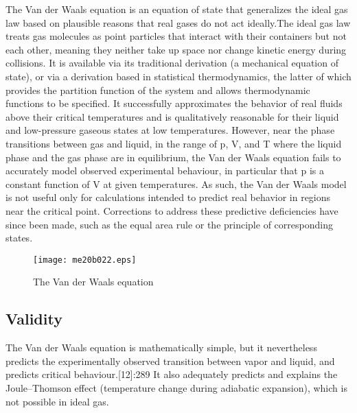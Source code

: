 The Van der Waals equation is an equation of state that generalizes the ideal gas law based on plausible reasons that real gases do not act ideally.The ideal gas law treats gas molecules as point particles that interact with their containers but not each other, meaning they neither take up space nor change kinetic energy during collisions.
It is available via its traditional derivation (a mechanical equation of state), or via a derivation based in statistical thermodynamics, the latter of which provides the partition function of the system and allows thermodynamic functions to be specified. It successfully approximates the behavior of real fluids above their critical temperatures and is qualitatively reasonable for their liquid and low-pressure gaseous states at low temperatures. However, near the phase transitions between gas and liquid, in the range of p, V, and T where the liquid phase and the gas phase are in equilibrium, the Van der Waals equation fails to accurately model observed experimental behaviour, in particular that p is a constant function of V at given temperatures. As such, the Van der Waals model is not useful only for calculations intended to predict real behavior in regions near the critical point. Corrections to address these predictive deficiencies have since been made, such as the equal area rule or the principle of corresponding states.

\begin{figure}[ht]
	{\begin{center}
		\texttt{[image: me20b022.eps]}
	\end{center}}
	\caption{The Van der Waals equation \cite{picture}}
	\label{f1:image}
\end{figure}
\subsection{Validity}
The Van der Waals equation is mathematically simple, but it nevertheless predicts the experimentally observed transition between vapor and liquid, and predicts critical behaviour.[12]:289 It also adequately predicts and explains the Joule–Thomson effect (temperature change during adiabatic expansion), which is not possible in ideal gas.

